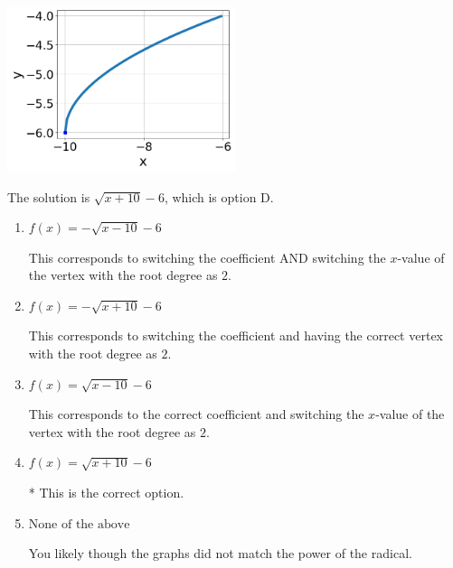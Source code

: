 \documentclass{extbook}[14pt]
\begin{document}
\begin{enumerate}
{\begin{center}
    \includegraphics[width=0.5\textwidth]{../Figures/radicalGraphToEquationB.png}
\end{center}


The solution is \( \sqrt{x + 10} - 6 \), which is option D.\begin{enumerate}[label=\Alph*.]
\item \( f(x) = - \sqrt{x - 10} - 6 \)

This corresponds to switching the coefficient AND switching the $x$-value of the vertex with the root degree as $2$.
\item \( f(x) = - \sqrt{x + 10} - 6 \)

This corresponds to switching the coefficient and having the correct vertex with the root degree as $2$.
\item \( f(x) = \sqrt{x - 10} - 6 \)

This corresponds to the correct coefficient and switching the $x$-value of the vertex with the root degree as $2$.
\item \( f(x) = \sqrt{x + 10} - 6 \)

* This is the correct option.
\item \( \text{None of the above} \)

You likely though the graphs did not match the power of the radical.
\end{enumerate}

}
\end{enumerate}
\end{document}
